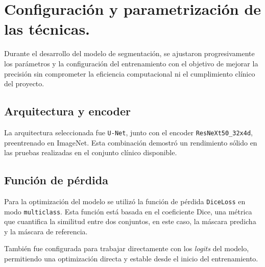 \section{Configuración y parametrización de las técnicas.}

Durante el desarrollo del modelo de segmentación, se ajustaron progresivamente los parámetros y la configuración del entrenamiento con el objetivo de mejorar la precisión sin comprometer la eficiencia computacional ni el cumplimiento clínico del proyecto.

\subsection{Arquitectura y encoder} 

La arquitectura seleccionada fue \texttt{U-Net}, junto con el encoder \texttt{ResNeXt50\_32x4d}, preentrenado en ImageNet. Esta combinación demostró un rendimiento sólido en las pruebas realizadas en el conjunto clínico disponible.

\subsection{Función de pérdida}
Para la optimización del modelo se utilizó la función de pérdida \texttt{DiceLoss} en modo \texttt{multiclass}. Esta función está basada en el coeficiente Dice, una métrica que cuantifica la similitud entre dos conjuntos, en este caso, la máscara predicha y la máscara de referencia.

También fue configurada para trabajar directamente con los \textit{logits} del modelo, permitiendo una optimización directa y estable desde el inicio del entrenamiento.

